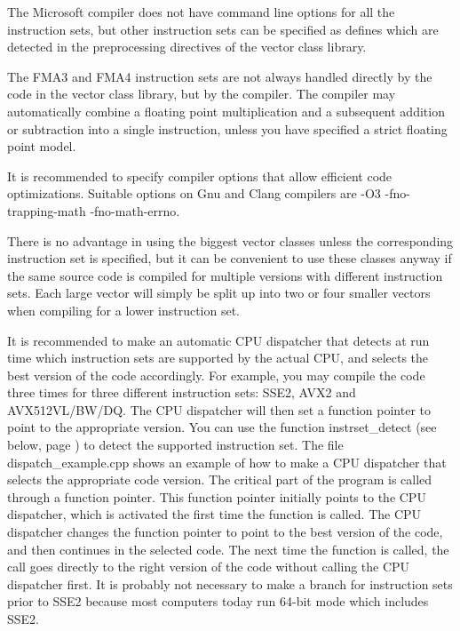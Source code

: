 \documentclass[vcl_manual.tex]{subfiles}
\begin{document}
The Microsoft compiler does not have command line options for all the instruction sets, but other instruction sets can be specified as defines which are detected in the preprocessing directives of the vector class library.

The FMA3 and FMA4 instruction sets are not always handled directly by the code in the vector class library, but by the compiler. The compiler may automatically combine a floating point multiplication and a subsequent addition or subtraction into a single instruction, unless you have specified a strict floating point model.

It is recommended to specify compiler options that allow efficient code optimizations. Suitable options on Gnu and Clang compilers are
-O3 -fno-trapping-math -fno-math-errno.

There is no advantage in using the biggest vector classes unless the corresponding instruction set is specified, but it can be convenient to use these classes anyway if the same source code is compiled for multiple versions with different instruction sets. Each large vector will simply be split up into two or four smaller vectors when compiling for a lower instruction set.

It is recommended to make an automatic CPU dispatcher that detects at run time which instruction sets are supported by the actual CPU, and selects the best version of the code accordingly. For example, you may compile the code three times for three different instruction sets: SSE2, AVX2 and AVX512VL/BW/DQ. The CPU dispatcher will then set a function pointer to point to the appropriate version. You can use the function instrset\_detect (see below, page \pageref{instrsetDetect}) to detect the supported instruction set. The file dispatch\_example.cpp shows an example of how to make a CPU dispatcher that selects the appropriate code version. The critical part of the program is called through a function pointer. This function pointer initially points to the CPU dispatcher, which is activated the first time the function is called. The CPU dispatcher changes the function pointer to point to the best version of the code, and then continues in the selected code. The next time the function is called, the call goes directly to the right version of the code without calling the CPU dispatcher first. It is probably not necessary to make a branch for instruction sets prior to SSE2 because most computers today run 64-bit mode which includes SSE2.
\end{document}
